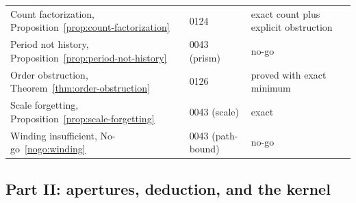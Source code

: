 \begin{longtable}{@{}p{}p{}p{}@{}}
Count factorization, Proposition~\ref{prop:count-factorization} & 0124 & exact count plus
  explicit obstruction \\
Period not history, Proposition~\ref{prop:period-not-history} & 0043 (prism) & no-go \\
Order obstruction, Theorem~\ref{thm:order-obstruction} & 0126 & proved with exact minimum \\
Scale forgetting, Proposition~\ref{prop:scale-forgetting} & 0043 (scale) & exact \\
Winding insufficient, No-go~\ref{nogo:winding} & 0043 (path-bound) & no-go \\
\bottomrule
\end{longtable}

\subsection{Part II: apertures, deduction, and the kernel}

